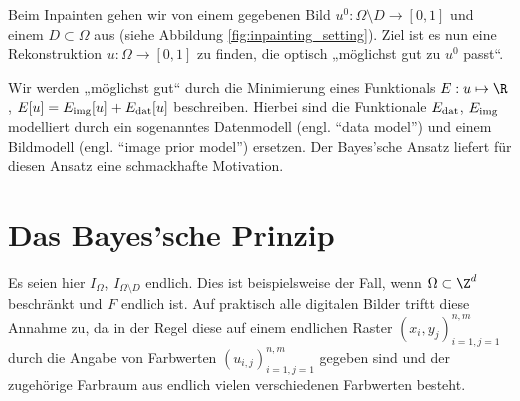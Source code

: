 \documentclass{mythesis}
\begin{document}
Beim Inpainten gehen wir von einem gegebenen Bild $u^0: \Omega \setminus D \to [0,1]$ und einem 
$D \subset \Omega$ aus (siehe Abbildung \ref{fig:inpainting_setting}). Ziel ist es nun eine Rekonstruktion $u: \Omega \to [0,1]$ zu finden, die optisch „möglichst gut zu $u^0$ passt“.

Wir werden „möglichst gut“ durch die Minimierung eines Funktionals $E: u \mapsto \R$,
\begin{math}
    E[u] = E_{\mathrm{img}}[u] + E_{\mathrm{dat}}[u]
\end{math}
beschreiben.
Hierbei sind die Funktionale $E_{\mathrm{dat}}$, $E_{\mathrm{img}}$ modelliert durch ein sogenanntes Datenmodell (engl. “data model”) und einem Bildmodell (engl. “image prior model”) ersetzen.
Der Bayes'sche Ansatz liefert für diesen Ansatz eine schmackhafte Motivation.


\section{Das Bayes'sche Prinzip}


Es seien hier $I_\Omega$, $I_{\Omega \setminus D}$ endlich.
Dies ist beispielsweise der Fall, wenn $\Omega \subset \Z^d$ beschränkt und $F$ endlich ist.
Auf praktisch alle digitalen Bilder triftt diese Annahme zu, da in der Regel diese auf einem endlichen Raster $(x_i, y_j)_{i=1,j=1}^{n,m}$ durch die Angabe von Farbwerten $(u_{i,j})_{i=1,j=1}^{n,m}$ gegeben sind und der zugehörige Farbraum aus endlich vielen verschiedenen Farbwerten besteht.
\end{document}
